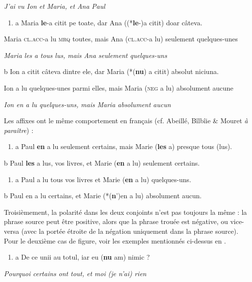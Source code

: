 {\itshape
J'ai vu Ion et Maria, et Ana Paul}


\begin{enumerate}
\item \label{bkm:Ref289301071}a  Maria \textbf{le}-a citit pe toate, dar Ana ((*\textbf{le}-)a citit) doar câteva.


\end{enumerate}
Maria \textsc{cl.acc-}a lu \textsc{mrq} toutes, mais Ana (\textsc{cl.acc-}a lu) seulement quelques-unes

{\itshape
Maria les a tous lus, mais Ana seulement quelques-uns}

  b  Ion a citit câteva dintre ele, dar Maria (*(\textbf{nu}) a citit) absolut niciuna.

    Ion a lu quelques-unes parmi elles, mais Maria (\textsc{neg} a lu) absolument aucune

{\itshape
Ion en a lu quelques-uns, mais Maria absolument aucun} 

Les affixes ont le même comportement en français (cf. Abeillé, Bîlbîie \& Mouret \textit{à paraître}) :


\begin{enumerate}
\item a   Paul \textbf{en} a lu seulement certains, mais Marie (\textbf{les} a) presque tous (lus).      


\end{enumerate}
b  Paul \textbf{les} a lus, vos livres, et Marie (\textbf{en} a lu) seulement certains.      


\begin{enumerate}
\item a   Paul a lu tous vos livres et Marie (\textbf{en} a lu) quelques-uns.      


\end{enumerate}
  b  Paul en a lu certains, et Marie (*(\textbf{n}')en a lu) absolument aucun.

Troisièmement, la polarité dans les deux conjoints n'est pas toujours la même : la phrase source peut être positive, alors que la phrase trouée est négative, ou vice-versa (avec la portée étroite de la négation uniquement dans la phrase source). Pour le deuxième cas de figure, voir les exemples mentionnés ci-dessus en .


\begin{enumerate}
\item a  De ce unii au totul, iar eu (\textbf{nu} am) nimic ?


\end{enumerate}
{\itshape
Pourquoi certains ont tout, et moi (je n'ai) rien}

